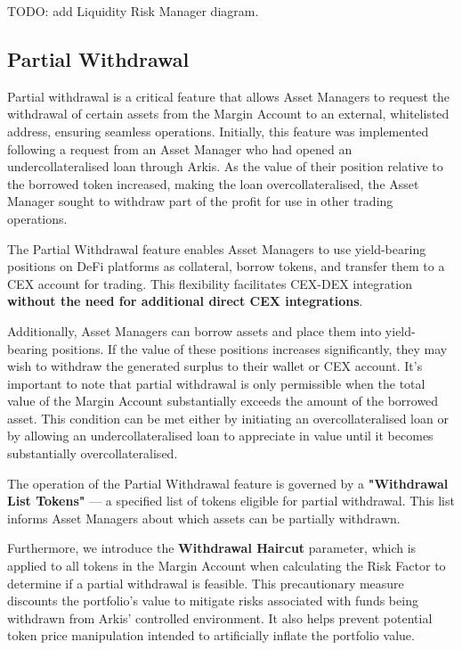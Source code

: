 \documentclass[conference]{IEEEtran}
\begin{document}
TODO: add Liquidity Risk Manager diagram.


\subsection{Partial Withdrawal}

Partial withdrawal is a critical feature that allows Asset Managers to request the withdrawal of certain assets from the Margin Account to an external, whitelisted address, ensuring seamless operations. Initially, this feature was implemented following a request from an Asset Manager who had opened an undercollateralised loan through Arkis. As the value of their position relative to the borrowed token increased, making the loan overcollateralised, the Asset Manager sought to withdraw part of the profit for use in other trading operations.

The Partial Withdrawal feature enables Asset Managers to use yield-bearing positions on DeFi platforms as collateral, borrow tokens, and transfer them to a CEX account for trading. This flexibility facilitates CEX-DEX integration \textbf{without the need for additional direct CEX integrations}.

Additionally, Asset Managers can borrow assets and place them into yield-bearing positions. If the value of these positions increases significantly, they may wish to withdraw the generated surplus to their wallet or CEX account. It's important to note that partial withdrawal is only permissible when the total value of the Margin Account substantially exceeds the amount of the borrowed asset. This condition can be met either by initiating an overcollateralised loan or by allowing an undercollateralised loan to appreciate in value until it becomes substantially overcollateralised.

The operation of the Partial Withdrawal feature is governed by a \textbf{"Withdrawal List Tokens"} — a specified list of tokens eligible for partial withdrawal. This list informs Asset Managers about which assets can be partially withdrawn.

Furthermore, we introduce the \textbf{Withdrawal Haircut} parameter, which is applied to all tokens in the Margin Account when calculating the Risk Factor to determine if a partial withdrawal is feasible. This precautionary measure discounts the portfolio's value to mitigate risks associated with funds being withdrawn from Arkis’ controlled environment. It also helps prevent potential token price manipulation intended to artificially inflate the portfolio value.
\end{document}
